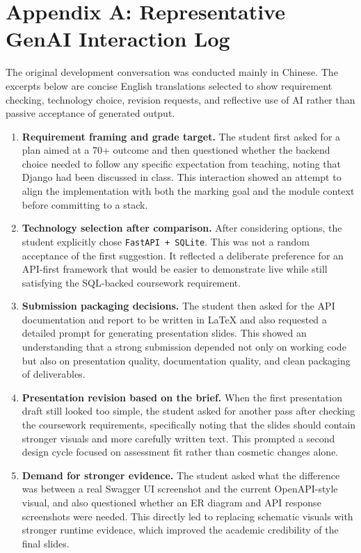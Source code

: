 \documentclass[11pt,a4paper]{article}
\begin{document}
\appendix
\newpage
\section*{Appendix A: Representative GenAI Interaction Log}
\small
The original development conversation was conducted mainly in Chinese. The excerpts below are concise English translations selected to show requirement checking, technology choice, revision requests, and reflective use of AI rather than passive acceptance of generated output.

\begin{enumerate}[leftmargin=*]
    \item \textbf{Requirement framing and grade target.} The student first asked for a plan aimed at a 70+ outcome and then questioned whether the backend choice needed to follow any specific expectation from teaching, noting that Django had been discussed in class. This interaction showed an attempt to align the implementation with both the marking goal and the module context before committing to a stack.

    \item \textbf{Technology selection after comparison.} After considering options, the student explicitly chose \texttt{FastAPI + SQLite}. This was not a random acceptance of the first suggestion. It reflected a deliberate preference for an API-first framework that would be easier to demonstrate live while still satisfying the SQL-backed coursework requirement.

    \item \textbf{Submission packaging decisions.} The student then asked for the API documentation and report to be written in LaTeX and also requested a detailed prompt for generating presentation slides. This showed an understanding that a strong submission depended not only on working code but also on presentation quality, documentation quality, and clean packaging of deliverables.

    \item \textbf{Presentation revision based on the brief.} When the first presentation draft still looked too simple, the student asked for another pass after checking the coursework requirements, specifically noting that the slides should contain stronger visuals and more carefully written text. This prompted a second design cycle focused on assessment fit rather than cosmetic changes alone.

    \item \textbf{Demand for stronger evidence.} The student asked what the difference was between a real Swagger UI screenshot and the current OpenAPI-style visual, and also questioned whether an ER diagram and API response screenshots were needed. This directly led to replacing schematic visuals with stronger runtime evidence, which improved the academic credibility of the final slides.


\end{enumerate}
\end{document}
